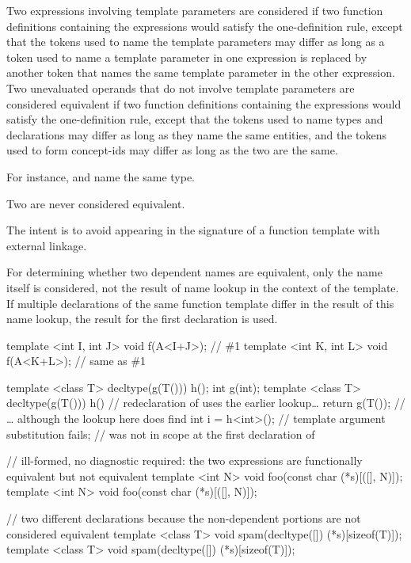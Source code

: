 \pnum
{}%
Two expressions involving template parameters are considered
if two function definitions containing the expressions would satisfy
the one-definition rule, except that the tokens used
to name the template parameters may differ as long as a token used to
name a template parameter in one expression is replaced by another token
that names the same template parameter in the other expression.
Two unevaluated operands that do not involve template parameters
are considered equivalent
if two function definitions containing the expressions
would satisfy the one-definition rule,
except that the tokens used to name types and declarations may differ
as long as they name the same entities, and
the tokens used to form concept-ids may differ
as long as the two  are the same.
\begin{note}
For instance,  and  name the same type.
\end{note}
Two  are never considered equivalent.
\begin{note}
The intent is to avoid  appearing in the
signature of a function template with external linkage.
\end{note}
For determining whether two dependent names are
equivalent, only the name itself is considered, not the result of name
lookup in the context of the template. If multiple declarations of the
same function template differ in the result of this name lookup, the
result for the first declaration is used.
\begin{example}
\begin{codeblock}
template <int I, int J> void f(A<I+J>);         // \#1
template <int K, int L> void f(A<K+L>);         // same as \#1

template <class T> decltype(g(T())) h();
int g(int);
template <class T> decltype(g(T())) h()         // redeclaration of  uses the earlier lookup\ldots
  { return g(T()); }                            // \ldots{} although the lookup here does find 
int i = h<int>();                               // template argument substitution fails; 
                                                // was not in scope at the first declaration of 

// ill-formed, no diagnostic required: the two expressions are functionally equivalent but not equivalent
template <int N> void foo(const char (*s)[([]{}, N)]);
template <int N> void foo(const char (*s)[([]{}, N)]);

// two different declarations because the non-dependent portions are not considered equivalent
template <class T> void spam(decltype([]{}) (*s)[sizeof(T)]);
template <class T> void spam(decltype([]{}) (*s)[sizeof(T)]);
\end{codeblock}
\end{example}
